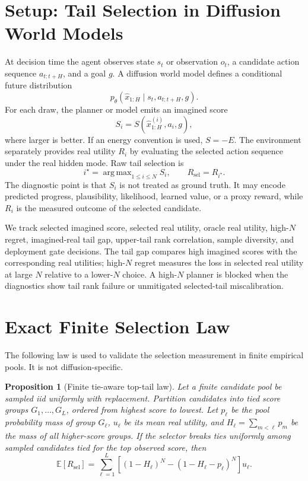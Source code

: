 \documentclass{article}
\newtheorem{proposition}{Proposition}
\DeclareMathOperator*{\argmax}{arg\,max}
\newcommand{\E}{\mathbb{E}}
\newcommand{\future}{\hat{x}_{1:H}}
\newcommand{\score}{S}
\newcommand{\utility}{R}
\begin{document}
\section{Setup: Tail Selection in Diffusion World Models}

At decision time the agent observes state $s_t$ or observation $o_t$, a candidate action sequence $a_{t:t+H}$, and a goal $g$. A diffusion world model defines a conditional future distribution
\begin{equation}
  p_\theta(\future \mid s_t, a_{t:t+H}, g).
\end{equation}
For each draw, the planner or model emits an imagined score
\begin{equation}
  \score_i = \score(\hat{x}^{(i)}_{1:H}, a_i, g),
\end{equation}
where larger is better. If an energy convention is used, $\score=-E$. The environment separately provides real utility $\utility_i$ by evaluating the selected action sequence under the real hidden mode. Raw tail selection is
\begin{equation}
  i^\star = \argmax_{1 \leq i \leq N} \score_i,\qquad
  \utility_{\mathrm{sel}} = \utility_{i^\star}.
\end{equation}
The diagnostic point is that $\score_i$ is not treated as ground truth. It may encode predicted progress, plausibility, likelihood, learned value, or a proxy reward, while $\utility_i$ is the measured outcome of the selected candidate.

We track selected imagined score, selected real utility, oracle real utility, high-$N$ regret, imagined-real tail gap, upper-tail rank correlation, sample diversity, and deployment gate decisions. The tail gap compares high imagined scores with the corresponding real utilities; high-$N$ regret measures the loss in selected real utility at large $N$ relative to a lower-$N$ choice. A high-$N$ planner is blocked when the diagnostics show tail rank failure or unmitigated selected-tail miscalibration.

\section{Exact Finite Selection Law}

The following law is used to validate the selection measurement in finite empirical pools. It is not diffusion-specific.

\begin{proposition}[Finite tie-aware top-tail law]
Let a finite candidate pool be sampled iid uniformly with replacement. Partition candidates into tied score groups $G_1,\ldots,G_L$, ordered from highest score to lowest. Let $p_\ell$ be the pool probability mass of group $G_\ell$, $u_\ell$ be its mean real utility, and $H_\ell=\sum_{m<\ell}p_m$ be the mass of all higher-score groups. If the selector breaks ties uniformly among sampled candidates tied for the top observed score, then
\begin{equation}
  \E[\utility_{\mathrm{sel}}]
  =
  \sum_{\ell=1}^{L}
  \left[
    (1-H_\ell)^N - (1-H_\ell-p_\ell)^N
  \right]u_\ell .
  \label{eq:finite-law}
\end{equation}
\end{proposition}
\end{document}
